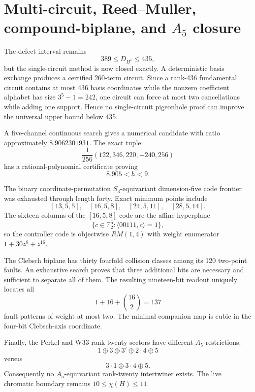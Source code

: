 \section{Multi-circuit, Reed--Muller, compound-biplane, and $A_5$ closure}
\label{sec:bt3500-3513}

The defect interval remains
\[
389\le D_{H^1}\le435,
\]
but the single-circuit method is now closed exactly. A deterministic basis exchange produces a certified 260-term circuit. Since a rank-436 fundamental circuit contains at most 436 basis coordinates while the nonzero coefficient alphabet has size $3^5-1=242$, one circuit can force at most two cancellations while adding one support. Hence no single-circuit pigeonhole proof can improve the universal upper bound below 435.

A five-channel continuous search gives a numerical candidate with ratio approximately $8.9062301931$. The exact tuple
\[
\frac1{256}(122,346,220,-240,256)
\]
has a rational-polynomial certificate proving
\[
8.905<h<9.
\]

The binary coordinate-permutation $S_3$-equivariant dimension-five code frontier was exhausted through length forty. Exact minimum points include
\[
[13,5,5],\quad[16,5,8],\quad[24,5,11],\quad[28,5,14].
\]
The sixteen columns of the $[16,5,8]$ code are the affine hyperplane
\[
\{c\in\mathbb F_2^5:\langle00111,c\rangle=1\},
\]
so the controller code is objectwise $RM(1,4)$ with weight enumerator $1+30z^8+z^{16}$.

The Clebsch biplane has thirty fourfold collision classes among its 120 two-point faults. An exhaustive search proves that three additional bits are necessary and sufficient to separate all of them. The resulting nineteen-bit readout uniquely locates all
\[
1+16+\binom{16}{2}=137
\]
fault patterns of weight at most two. The minimal companion map is cubic in the four-bit Clebsch-axis coordinate.

Finally, the Perkel and W33 rank-twenty sectors have different $A_5$ restrictions:
\[
1\oplus3\oplus3'\oplus2\cdot4\oplus5
\]
versus
\[
3\cdot1\oplus3\cdot4\oplus5.
\]
Consequently no $A_5$-equivariant rank-twenty intertwiner exists. The live chromatic boundary remains $10\le\chi(H)\le11$.
